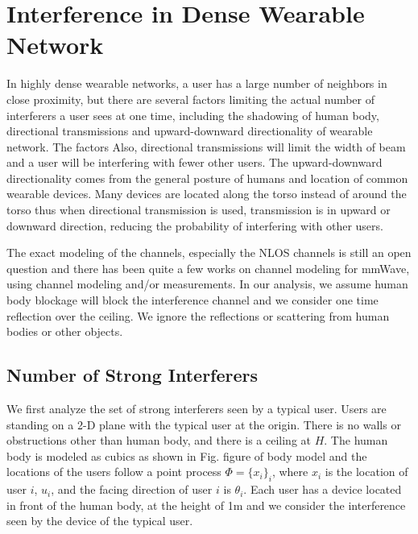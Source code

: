 \documentclass[10pt, conference, letterpaper]{IEEEtran}
\begin{document}
\section{Interference in Dense Wearable Network}\label{section:channel}
In highly dense wearable networks, a user has a large number of neighbors in close proximity, but there are several factors limiting the actual number of interferers a user sees at one time, including the shadowing of human body, directional transmissions and upward-downward directionality of wearable network. The factors Also, directional transmissions will limit the width of beam and a user will be interfering with fewer other users. The upward-downward directionality comes from the general posture of humans and location of common wearable devices. Many devices are located along the torso instead of around the torso thus when directional transmission is used, transmission is in upward or downward direction, reducing the probability of interfering with other users. 

The exact modeling of the channels, especially the NLOS channels is still an open question and there has been quite a few works on channel modeling for mmWave, using channel modeling and/or measurements. In our analysis, we assume human body blockage will block the interference channel and we consider one time reflection over the ceiling. We ignore the reflections or scattering from human bodies or other objects.
 
\subsection{Number of Strong Interferers}
We first analyze the set of strong interferers seen by a typical user. Users are standing on a 2-D plane with the typical user at the origin. There is no walls or obstructions other than human body, and there is a ceiling at $H$. The human body is modeled as cubics as shown in Fig. {figure of body model} and the locations of the users follow a point process $\Phi=\{x_i\}_i$, where $x_i$ is the location of user $i$, $u_i$, and the facing direction of user $i$ is $\theta_i$. Each user has a device located in front of the human body, at the height of 1m and we consider the interference seen by the device of the typical user.
\end{document}
